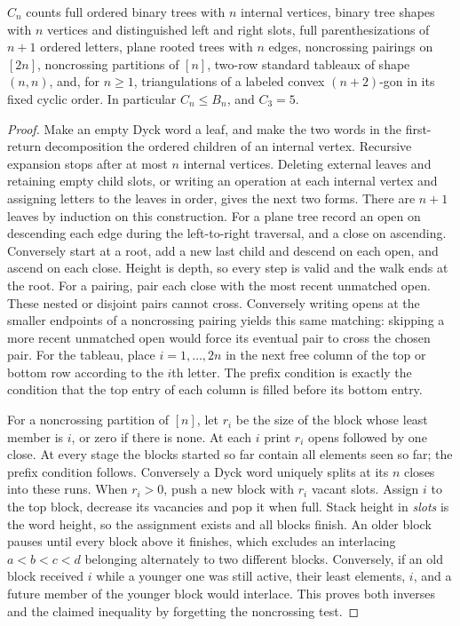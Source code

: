 \begin{proposition}\label{result11}
$C_n$ counts full ordered binary trees with $n$ internal vertices,
binary tree shapes with $n$ vertices and distinguished left and right
slots, full parenthesizations of $n+1$ ordered letters, plane rooted trees
with $n$ edges, noncrossing pairings on $[2n]$, noncrossing partitions of
$[n]$, two-row standard tableaux of shape $(n,n)$, and, for $n\ge1$,
triangulations of a labeled convex $(n+2)$-gon in its fixed cyclic order.
In particular $C_n\le B_n$, and $C_3=5$.
\end{proposition}
\begin{proof}
Make an empty Dyck word a leaf, and make the two words in the first-return
decomposition the ordered children of an internal vertex. Recursive
expansion stops after at most $n$ internal vertices. Deleting external
leaves and retaining empty child slots, or writing an operation at each
internal vertex and assigning letters to the leaves in order, gives the
next two forms. There are $n+1$ leaves by induction on this construction.
For a plane tree record an open on descending each edge during the
left-to-right traversal, and a close on ascending. Conversely start at a
root, add a new last child and descend on each open, and ascend on each
close. Height is depth, so every step is valid and the walk ends at the
root. For a pairing, pair each close with the most recent unmatched open.
These nested or disjoint pairs cannot cross. Conversely writing opens at
the smaller endpoints of a noncrossing pairing yields this same matching:
skipping a more recent unmatched open would force its eventual pair to
cross the chosen pair. For the tableau, place $i=1,\ldots,2n$ in the next
free column of the top or bottom row according to the $i$th letter.
The prefix condition is exactly the condition that the top entry of each
column is filled before its bottom entry.

For a noncrossing partition of $[n]$, let $r_i$ be the size of the block
whose least member is $i$, or zero if there is none. At each $i$ print
$r_i$ opens followed by one close. At every stage the blocks started so
far contain all elements seen so far; the prefix condition follows.
Conversely a Dyck word uniquely splits at its $n$ closes into these runs.
When $r_i>0$, push a new block with $r_i$ vacant slots. Assign $i$ to
the top block, decrease its vacancies and pop it when full. Stack height
in \emph{slots} is the word height, so the assignment exists and all
blocks finish. An older block pauses until every block above it finishes,
which excludes an interlacing $a<b<c<d$ belonging alternately to two
different blocks. Conversely, if an old block received $i$ while a younger
one was still active, their least elements, $i$, and a future member of
the younger block would interlace. This proves both inverses and the
claimed inequality by forgetting the noncrossing test.


\end{proof}
